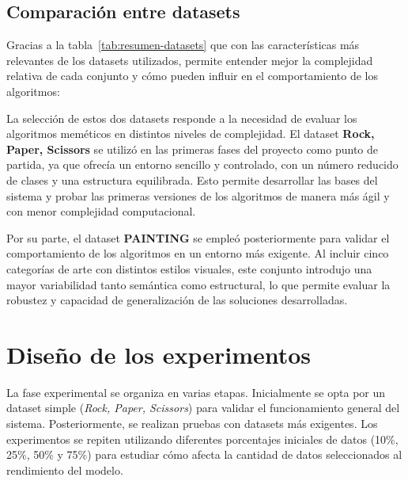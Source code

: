 \subsection{Comparación entre datasets}\label{subsec:comparacion-entre-datasets}
Gracias a la tabla~\ref{tab:resumen-datasets} que con las características más relevantes de los datasets utilizados,
permite entender mejor la complejidad relativa de cada conjunto y cómo pueden influir en el comportamiento de los algoritmos:

\begin{table}[htp]
    \centering
    \caption{Resumen comparativo de los datasets utilizados}
    \label{tab:resumen-datasets}
\end{table}

La selección de estos dos datasets responde a la necesidad de evaluar los algoritmos meméticos en distintos niveles de complejidad.
El dataset \textbf{Rock, Paper, Scissors} se utilizó en las primeras fases del proyecto como punto de partida,
ya que ofrecía un entorno sencillo y controlado, con un número reducido de clases y una estructura equilibrada.
Esto permite desarrollar las bases del sistema y probar las primeras versiones de los algoritmos de manera más ágil y con menor complejidad computacional.

Por su parte, el dataset \textbf{PAINTING} se empleó posteriormente para validar el comportamiento de los algoritmos en un entorno más exigente.
Al incluir cinco categorías de arte con distintos estilos visuales, este conjunto introdujo una mayor variabilidad tanto semántica como estructural,
lo que permite evaluar la robustez y capacidad de generalización de las soluciones desarrolladas.


\section{Diseño de los experimentos}\label{sec:diseño-de-los-experimentos}
La fase experimental se organiza en varias etapas.
Inicialmente se opta por un dataset simple (\textit{Rock, Paper, Scissors}) para validar el funcionamiento general del sistema.
Posteriormente, se realizan pruebas con datasets más exigentes.
Los experimentos se repiten utilizando diferentes porcentajes iniciales de datos (10\%, 25\%, 50\% y 75\%)
para estudiar cómo afecta la cantidad de datos seleccionados al rendimiento del modelo.


